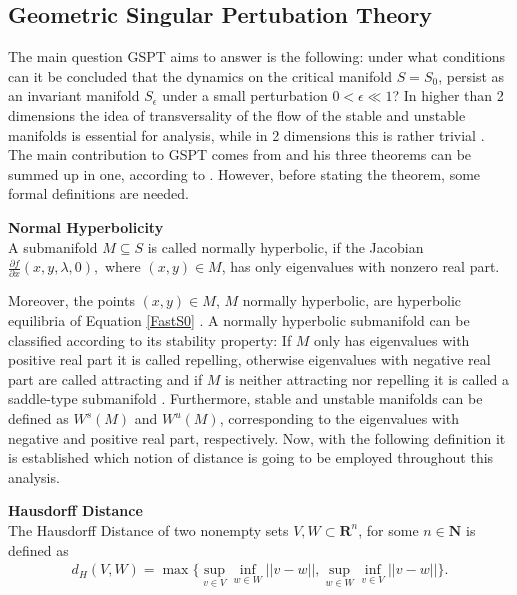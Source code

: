 \subsection{Geometric Singular Pertubation Theory}	
The main question GSPT aims to answer is the following: under what conditions can it be concluded that the dynamics on the critical manifold $S=S_0$, persist as an invariant manifold $S_{\epsilon}$ under a small perturbation $0<\epsilon\ll 1$? In higher than 2 dimensions the idea of transversality of the flow of the stable and unstable manifolds is essential for analysis, while in 2 dimensions this is rather trivial \citep{MMO}. The main contribution to GSPT comes from \citet{Fenichel}  and his three theorems can be summed up in one, according to \citep{MMO}.
However, before stating the theorem, some formal definitions are needed.

\begin{definition}{\textbf{Normal Hyperbolicity \citep{firstpaper}}} \label{NormHyp}
	\\
	A submanifold $M \subseteq S$ is called normally hyperbolic, if the Jacobian $ \frac{\partial f}{\partial x}(x,y, \lambda, 0),$ where $(x,y) \in M$, has only eigenvalues with nonzero real part.
\end{definition} 

Moreover, the points $(x,y) \in M$, $M$ normally hyperbolic, are hyperbolic equilibria of Equation \ref{FastS0} \citep{MMO}.
A normally hyperbolic submanifold can be classified according to its stability property: If $M$ only has eigenvalues with positive real part it is called repelling, otherwise eigenvalues with negative real part are called attracting and if $M$ is neither attracting nor repelling it is called a saddle-type submanifold \citep{MMO}. Furthermore, stable and unstable manifolds can be defined as $W^s(M)$  and $W^u(M)$, corresponding to the eigenvalues with negative and positive real part, respectively. Now, with the following definition it is established which notion of distance is going to be employed throughout this analysis.

\begin{definition}{\textbf{Hausdorff Distance \citep{Kuehn}}}\\
	The Hausdorff Distance of two nonempty sets $V,W \subset \mathbf{R}^n$, for some $n \in \mathbf{N}$ 
	is defined as 
	\begin{align*}
	d_H(V,W)= \max \{ \sup_{v \in V} \inf_{w \in W} || v- w ||, \sup_ {w \in W}\inf_{v \in V} || v- w ||\}.
	\end{align*}
\end{definition}

